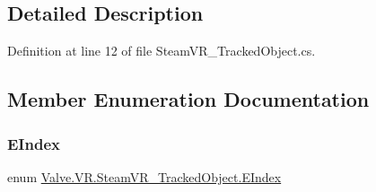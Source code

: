 \subsection{Detailed Description}


Definition at line 12 of file Steam\+V\+R\+\_\+\+Tracked\+Object.\+cs.



\subsection{Member Enumeration Documentation}
\mbox{\label{class_valve_1_1_v_r_1_1_steam_v_r___tracked_object_a3d437894eff0bfc81eeb21a8c478413e}} 
\subsubsection{\texorpdfstring{EIndex}{EIndex}}
{\footnotesize\ttfamily enum \mbox{\hyperlink{class_valve_1_1_v_r_1_1_steam_v_r___tracked_object_a3d437894eff0bfc81eeb21a8c478413e}{Valve.\+V\+R.\+Steam\+V\+R\+\_\+\+Tracked\+Object.\+E\+Index}}\hspace{0.3cm}{\ttfamily [strong]}}

